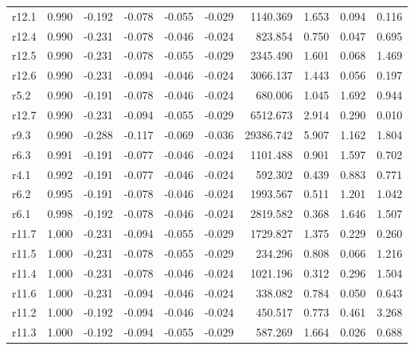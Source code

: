 \begin{longtable}{lrrrrrrrrr}
r12.1 &     0.990 &   -0.192 &   -0.078 &  -0.055 &  -0.029 &    1140.369 &    1.653 &        0.094 &       0.116 \\
r12.4 &     0.990 &   -0.231 &   -0.078 &  -0.046 &  -0.024 &     823.854 &    0.750 &        0.047 &       0.695 \\
r12.5 &     0.990 &   -0.231 &   -0.078 &  -0.055 &  -0.029 &    2345.490 &    1.601 &        0.068 &       1.469 \\
r12.6 &     0.990 &   -0.231 &   -0.094 &  -0.046 &  -0.024 &    3066.137 &    1.443 &        0.056 &       0.197 \\
 r5.2 &     0.990 &   -0.191 &   -0.078 &  -0.046 &  -0.024 &     680.006 &    1.045 &        1.692 &       0.944 \\
r12.7 &     0.990 &   -0.231 &   -0.094 &  -0.055 &  -0.029 &    6512.673 &    2.914 &        0.290 &       0.010 \\
 r9.3 &     0.990 &   -0.288 &   -0.117 &  -0.069 &  -0.036 &   29386.742 &    5.907 &        1.162 &       1.804 \\
 r6.3 &     0.991 &   -0.191 &   -0.077 &  -0.046 &  -0.024 &    1101.488 &    0.901 &        1.597 &       0.702 \\
 r4.1 &     0.992 &   -0.191 &   -0.077 &  -0.046 &  -0.024 &     592.302 &    0.439 &        0.883 &       0.771 \\
 r6.2 &     0.995 &   -0.191 &   -0.078 &  -0.046 &  -0.024 &    1993.567 &    0.511 &        1.201 &       1.042 \\
 r6.1 &     0.998 &   -0.192 &   -0.078 &  -0.046 &  -0.024 &    2819.582 &    0.368 &        1.646 &       1.507 \\
r11.7 &     1.000 &   -0.231 &   -0.094 &  -0.055 &  -0.029 &    1729.827 &    1.375 &        0.229 &       0.260 \\
r11.5 &     1.000 &   -0.231 &   -0.078 &  -0.055 &  -0.029 &     234.296 &    0.808 &        0.066 &       1.216 \\
r11.4 &     1.000 &   -0.231 &   -0.078 &  -0.046 &  -0.024 &    1021.196 &    0.312 &        0.296 &       1.504 \\
r11.6 &     1.000 &   -0.231 &   -0.094 &  -0.046 &  -0.024 &     338.082 &    0.784 &        0.050 &       0.643 \\
r11.2 &     1.000 &   -0.192 &   -0.094 &  -0.046 &  -0.024 &     450.517 &    0.773 &        0.461 &       3.268 \\
r11.3 &     1.000 &   -0.192 &   -0.094 &  -0.055 &  -0.029 &     587.269 &    1.664 &        0.026 &       0.688 \\

\end{longtable}

